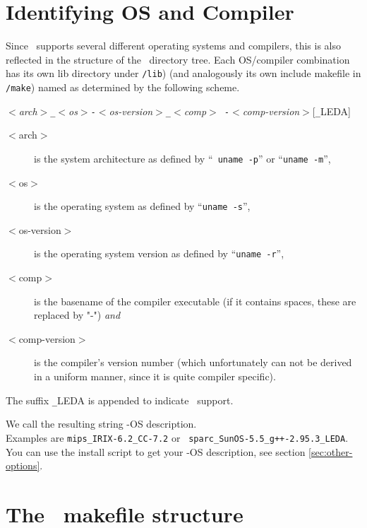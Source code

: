 \section{Identifying OS and Compiler}\label{sec:os-compiler-id}

Since \cgal\ supports several different operating systems and
compilers, this is also reflected in the structure of the \cgal\ 
directory tree. Each OS/compiler combination has its own lib directory
under \texttt{\cgaldir/lib}) (and analogously its own include
makefile in \texttt{\cgaldir/make}) named as
determined by the following scheme.
\begin{center}
  \textit{$<$arch$>$\texttt{\_}$<$os$>$\texttt{-}$<$os-version$>$\texttt{\_}$<$comp$>${\tt
    -}$<$comp-version$>$}[\texttt{\_}LEDA]
\end{center}

\begin{description}
\item[$<$arch$>$] is the system architecture as defined by ``{\tt
    uname -p}'' or ``\texttt{uname -m}'',
\item[$<$os$>$] is the operating system as defined by ``\texttt{uname
    -s}'',
\item[$<$os-version$>$] is the operating system version as defined by
  ``\texttt{uname -r}'',
\item[$<$comp$>$] is the basename of the compiler executable (if it
  contains spaces, these are replaced by "-") \textit{and}
\item[$<$comp-version$>$] is the compiler's version number (which
  unfortunately can not be derived in a uniform manner, since it is
  quite compiler specific).
\end{description}

The suffix \texttt{\_}LEDA is appended to indicate \leda\ support. 

We call the resulting string \cgal-OS description.\\ Examples are
\texttt{mips\_IRIX-6.2\_CC-7.2} or {\tt
  sparc\_SunOS-5.5\_g++-2.95.3\_LEDA}.\\ You can use the install script
to get your \cgal-OS description, see section \ref{sec:other-options}.

\section{The \cgal\ makefile structure}\label{sec:makefiles}

